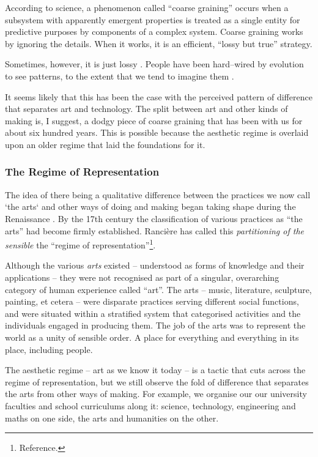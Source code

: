 \documentclass[letter:wpaper]{article}
\begin{document}
    According to science, a phenomenon called ``coarse graining'' occurs when a subsystem with apparently emergent properties is treated as a single entity for predictive purposes by components of a complex system. Coarse graining works by ignoring the details. When it works, it is an efficient, ``lossy but true'' \citep[p.4]{FlackCrsGrnng2017} strategy.

    Sometimes, however, it is just lossy \citep[p.8]{FlackCrsGrnng2017}. People have been hard–wired by evolution to see patterns, to the extent that we tend to imagine them \citep{FristonThFrEnrgPrncpl2010}.
    
    It seems likely that this has been the case with the perceived pattern of difference that separates art and technology. The split between art and other kinds of making is, I suggest, a dodgy piece of coarse graining that has been with us for about six hundred years. This is possible because the aesthetic regime is overlaid upon an older regime that laid the foundations for it. 
    
    \subsubsection{The Regime of Representation}

    The idea of there being a qualitative difference between the practices we now call ‘the arts‘ and other ways of doing and making began taking shape during the Renaissance \citep[p.136]{TatarkiewiczWhtIsArt1971}. By the 17th century the classification of various practices as ``the arts'' had become firmly established. Rancière has called this \emph{partitioning of the sensible} the ``regime of representation''\footnote{
        Reference.
    }.
    
    Although the various \emph{arts} existed – understood as forms of knowledge and their applications – they were not recognised as part of a singular, overarching category of human experience called ``art''. The arts – music, literature, sculpture, painting, et cetera – were disparate practices serving different social functions, and were situated within a stratified system that categorised activities and the individuals engaged in producing them. The job of the arts was to represent the world as a unity of sensible order. A place for everything and everything in its place, including people.
    
    The aesthetic regime -- art as we know it today -- is a tactic that cuts across the regime of representation, but we still observe the fold of difference that separates the arts from other ways of making. For example, we organise our our university faculties and school curriculums along it: science, technology, engineering and maths on one side, the arts and humanities on the other. 
    
\end{document}
